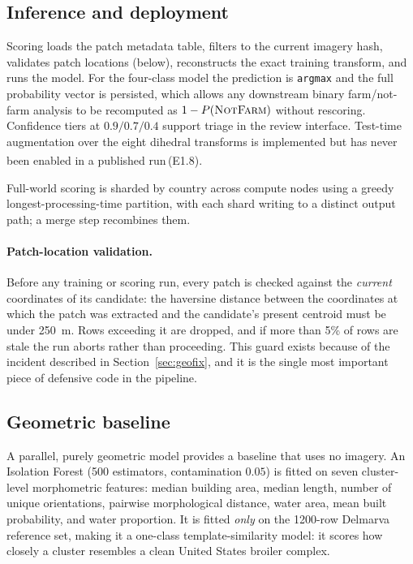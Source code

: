 \documentclass[11pt,a4paper]{article}
\newcommand{\code}[1]{\texttt{\small #1}}
\newcommand{\unablated}[1]{\textsuperscript{\dag}\,(#1)}
\begin{document}
\subsection{Inference and deployment}
\label{sec:inference}

Scoring loads the patch metadata table, filters to the current imagery hash,
validates patch locations (below), reconstructs the exact training transform,
and runs the model. For the four-class model the prediction is \code{argmax} and
the full probability vector is persisted, which allows any downstream
binary farm/not-farm analysis to be recomputed as \(1 - P(\textsc{NotFarm})\)
without rescoring. Confidence tiers at $0.9/0.7/0.4$ support triage in the
review interface. Test-time augmentation over the eight dihedral transforms is
implemented but has never been enabled in a published run\unablated{E1.8}.

Full-world scoring is sharded by country across compute nodes using a greedy
longest-processing-time partition, with each shard writing to a distinct output
path; a merge step recombines them.

\paragraph{Patch-location validation.}
Before any training or scoring run, every patch is checked against the
\emph{current} coordinates of its candidate: the haversine distance between the
coordinates at which the patch was extracted and the candidate's present
centroid must be under \SI{250}{\metre}. Rows exceeding it are dropped, and if
more than 5\% of rows are stale the run aborts rather than proceeding. This
guard exists because of the incident described in Section~\ref{sec:geofix}, and
it is the single most important piece of defensive code in the pipeline.

\subsection{Geometric baseline}
\label{sec:if}

A parallel, purely geometric model provides a baseline that uses no imagery. An
Isolation Forest \citep{liu2008isolation,pedregosa2011sklearn} (500 estimators,
contamination $0.05$) is fitted on seven cluster-level morphometric features:
median building area, median length, number of unique orientations, pairwise
morphological distance, water area, mean built probability, and water proportion.
It is fitted \emph{only} on the \num{1200}-row Delmarva reference set, making it a
one-class template-similarity model: it scores how closely a cluster resembles a
clean United States broiler complex.
\end{document}
